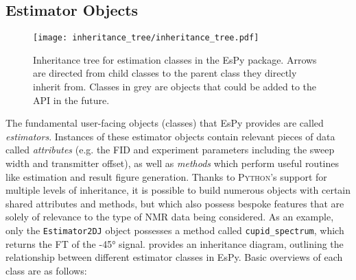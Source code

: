 \subsection{Estimator Objects}
\label{subsec:estimator-objects}
\begin{figure}
    \centering
    \texttt{[image: inheritance\_tree/inheritance\_tree.pdf]}
    \caption[
        Inheritance tree for estimation classes in the \acs{EsPy} package.
    ]{
        Inheritance tree for estimation classes in the \acs{EsPy} package.
        Arrows are directed from child classes to the parent class they
        directly inherit from. Classes in grey are objects that could be added
        to the \ac{API} in the future.
    }
    \label{fig:inheritance}
\end{figure}
The fundamental user-facing objects (classes) that \ac{EsPy} provides are
called \emph{estimators}.
Instances of these estimator objects contain relevant pieces of data called
\emph{attributes} (e.g. the \ac{FID} and experiment parameters including the sweep
width and transmitter offset), as well as \emph{methods} which perform useful
routines like estimation and result figure generation.
Thanks to \textsc{Python}'s support for multiple levels of inheritance, it is
possible to build numerous objects with certain shared attributes and methods,
but which also possess bespoke features that are solely of relevance to
the type of \ac{NMR} data being considered. As an example, only the
\texttt{Estimator2DJ} object possesses a method called \texttt{cupid\_spectrum},
which returns the \ac{FT} of the \ang{-45} signal.
 provides an inheritance
diagram, outlining the relationship between different estimator classes in
\ac{EsPy}. Basic overviews of each class are as follows:
